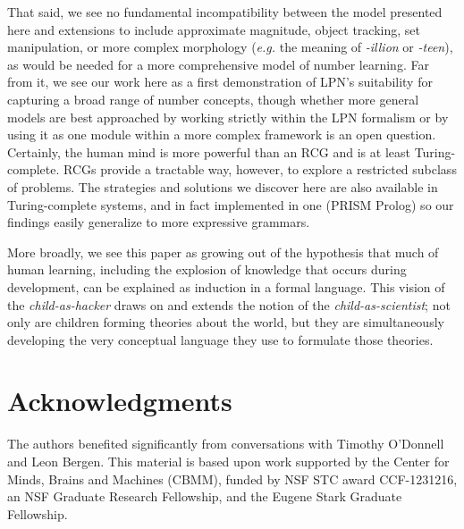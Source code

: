 \documentclass[10pt,letterpaper]{article}
\begin{document}
That said, we see no fundamental incompatibility between the model
presented here and extensions to include approximate magnitude, object
tracking, set manipulation, or more complex morphology ({\it e.g.} the
meaning of \emph{-illion} or \emph{-teen}), as would be needed for a
more comprehensive model of number learning. Far from it, we see our
work here as a first demonstration of LPN's suitability for capturing
a broad range of number concepts, though whether more general models
are best approached by working strictly within the LPN formalism or by
using it as one module within a more complex framework is an open
question. Certainly, the human mind is more powerful than an RCG and
is at least Turing-complete. RCGs provide a tractable way, however, to
explore a restricted subclass of problems. The strategies and
solutions we discover here are also available in Turing-complete
systems, and in fact implemented in one (PRISM Prolog) so our findings
easily generalize to more expressive grammars.

More broadly, we see this paper as growing out of the hypothesis that
much of human learning, including the explosion of knowledge that
occurs during development, can be explained as induction in a formal
language. This vision of the \emph{child-as-hacker} draws on and
extends the notion of the \emph{child-as-scientist}; not only are
children forming theories about the world, but they are simultaneously
developing the very conceptual language they use to formulate those
theories.


\section{Acknowledgments}

The authors benefited significantly from conversations with Timothy
O'Donnell and Leon Bergen. This material is based upon work supported
by the Center for Minds, Brains and Machines (CBMM), funded by NSF STC
award CCF-1231216, an NSF Graduate Research Fellowship, and the Eugene
Stark Graduate Fellowship.




\setlength{\bibleftmargin}{.125in}
\setlength{\bibindent}{-\bibleftmargin}

\end{document}
